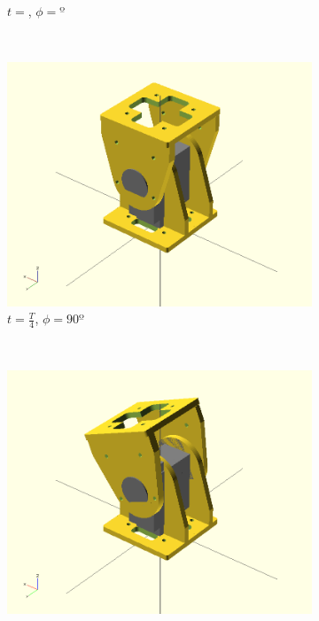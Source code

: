 \begin{figure}[h]
\begin{subfigure}[b]{0.18\textwidth}
                \caption{$t = $, $\phi=º$}
                \label{fig:Gait_osc_offset_67_5}
        \end{subfigure}
        ~
        \begin{subfigure}[b]{0.18\textwidth}
         	   \centering
                \includegraphics[width=\textwidth]{images/Gait_osc_offset_90.png}
                \caption{$t = \frac{T}{4}$, $\phi=90º$}
                \label{fig:Gait_osc_offset_90}
        \end{subfigure}
        ~
        \begin{subfigure}[b]{0.18\textwidth}
         	   \centering
                \includegraphics[width=\textwidth]{images/Gait_osc_offset_67_5.png}

\end{subfigure}
\end{figure}
